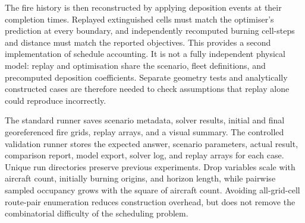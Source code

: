 The fire history is then reconstructed by applying deposition events at their completion times. Replayed extinguished cells must match the optimiser's prediction at every boundary, and independently recomputed burning cell-steps and distance must match the reported objectives. This provides a second implementation of schedule accounting. It is not a fully independent physical model: replay and optimisation share the scenario, fleet definitions, and precomputed deposition coefficients. Separate geometry tests and analytically constructed cases are therefore needed to check assumptions that replay alone could reproduce incorrectly.

The standard runner saves scenario metadata, solver results, initial and final georeferenced fire grids, replay arrays, and a visual summary. The controlled validation runner stores the expected answer, scenario parameters, actual result, comparison report, model export, solver log, and replay arrays for each case. Unique run directories preserve previous experiments. Drop variables scale with aircraft count, initially burning origins, and horizon length, while pairwise sampled occupancy grows with the square of aircraft count. Avoiding all-grid-cell route-pair enumeration reduces construction overhead, but does not remove the combinatorial difficulty of the scheduling problem.
